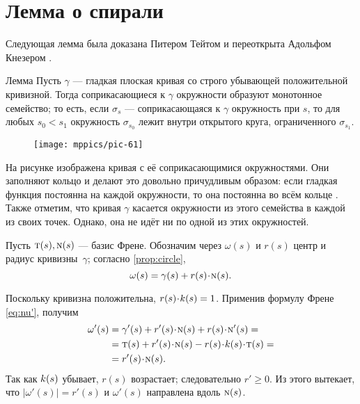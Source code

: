 \section{Лемма о спирали}
\label{spiral}

Следующая лемма была доказана Питером Тейтом \cite{tait}
и переоткрыта Адольфом Кнезером \cite{kneser}.


\begin{thm}{Лемма}\label{lem:spiral}
Пусть $\gamma$ --- гладкая плоская кривая со строго убывающей положительной кривизной.
Тогда соприкасающиеся к $\gamma$ окружности образуют монотонное семейство;
то есть, если $\sigma_s$ --- соприкасающаяся к $\gamma$ окружность при $s$,
то для любых $s_0<s_1$ окружность $\sigma_{s_0}$ лежит внутри открытого круга, ограниченного $\sigma_{s_1}$.
\end{thm}

{

\begin{wrapfigure}{r}{31 mm}
\vskip-0mm
\texttt{[image: mppics/pic-61]}
\end{wrapfigure}

На рисунке изображена кривая с её соприкасающимися окружностями.
Они заполняют кольцо и делают это довольно причудливым образом: если гладкая функция постоянна на каждой окружности, то она постоянна во всём кольце \cite[Лекция 10]{fuchs-tabachnikov}.
Также отметим, что кривая $\gamma$ касается окружности из этого семейства в каждой из своих точек.
Однако, она не идёт ни по одной из этих окружностей.

}

Пусть $\text{\sc{t}}(s),\text{\sc{n}}(s)$ --- базис Френе.
Обозначим через $\omega(s)$ и $r(s)$
центр и радиус кривизны~$\gamma$;
согласно \ref{prop:circle},
\[\omega(s)=\gamma(s)+r(s)\cdot \norm(s).\]

Поскольку кривизна положительна, $r(s)\cdot\skur(s)=1$.
Применив формулу Френе \ref{eq:nu'}, получим
\begin{align*}
\omega'(s)&=\gamma'(s)+r'(s)\cdot \norm(s)+r(s)\cdot \norm'(s)=
\\
&=\tan(s)+r'(s)\cdot \norm(s)-r(s)\cdot \skur(s)\cdot \tan(s)=
\\
&=r'(s)\cdot \norm(s).
\end{align*}
Так как $k(s)$ убывает, $r(s)$ возрастает;
следовательно $r'\ge 0$.
Из этого вытекает, что $|\omega'(s)|= r'(s)$ и $\omega'(s)$ направлена вдоль $\text{\sc{n}}(s)$.


